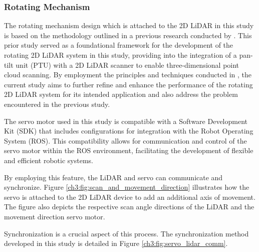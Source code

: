 \subsubsection{Rotating Mechanism}

The rotating mechanism design which is attached to the 2D LiDAR in this study is based on the methodology outlined in a previous research conducted by \citet{clar2022}. This prior study served as a foundational framework for the development of the rotating 2D LiDAR system in this study, providing into the integration of a pan-tilt unit (PTU) with a 2D LiDAR scanner to enable three-dimensional point cloud scanning. By employment the principles and techniques conducted in \citet{clar2022}, the current study aims to further refine and enhance the performance of the rotating 2D LiDAR system for its intended application and also address the problem encountered in the previous study.


The servo motor used in this study is compatible with a Software Development Kit (SDK) that includes configurations for integration with the Robot Operating System (ROS). This compatibility allows for communication and control of the servo motor within the ROS environment, facilitating the development of flexible and efficient robotic systems.

By employing this feature, the LiDAR and servo can communicate and synchronize. Figure \ref{ch3:fig:scan_and_movement_direction} illustrates how the servo is attached to the 2D LiDAR device to add an additional axis of movement. The figure also depicts the respective scan angle directions of the LiDAR and the movement direction servo motor.

Synchronization is a crucial aspect of this process. The synchronization method developed in this study is detailed in Figure \ref{ch3:fig:servo_lidar_comm}.

